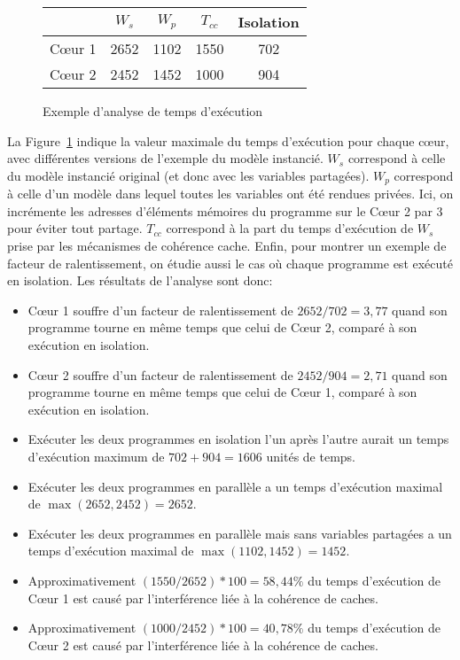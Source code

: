 \begin{example}
\begin{figure}[hbt]
\centering
\begin{tabular}{|c|c|c|c|c|}
\cline{2-5}
\multicolumn{1}{c|}{}
      & $W_s$ & $W_p$ & $T_{cc}$ & Isolation \\
\hline
Cœur 1 & 2652 & 1102 & 1550 & 702\\
\hline
Cœur 2 & 2452 & 1452 & 1000 & 904\\
\hline
\end{tabular}
\caption{Exemple d'analyse de temps d'exécution}
\label{fr:fig:analysis:wcet_calc}
\end{figure}
La Figure~\ref{fr:fig:analysis:wcet_calc} indique la valeur maximale du temps
d'exécution pour chaque cœur, avec différentes versions de l'exemple du modèle
instancié.
$W_s$ correspond à celle du modèle instancié original (et donc avec les
variables partagées). $W_p$ correspond à celle d'un modèle dans lequel toutes les
variables ont été rendues privées. Ici, on incrémente les adresses d'éléments
mémoires du programme sur le Cœur 2 par $3$ pour éviter tout partage. $T_{cc}$
correspond à la part du temps d'exécution de $W_s$ prise par les mécanismes de
cohérence cache. Enfin, pour montrer un exemple de facteur de ralentissement, on
étudie aussi le cas où chaque programme est exécuté en isolation.
Les résultats de l'analyse sont donc:
\begin{itemize}
    \setlength{\itemsep}{0pt}%
   \setlength{\parskip}{0pt}%
\item
   Cœur 1 souffre d'un facteur de ralentissement de $2652/702 = 3,77$ quand son
   programme tourne en même temps que celui de Cœur 2, comparé à son exécution
   en isolation.
\item
   Cœur 2 souffre d'un facteur de ralentissement de $2452/904 = 2,71$ quand son
   programme tourne en même temps que celui de Cœur 1, comparé à son exécution
   en isolation.
\item
   Exécuter les deux programmes en isolation l'un après l'autre aurait un temps
   d'exécution maximum de $702 + 904 = 1606$ unités de temps.
\item
   Exécuter les deux programmes en parallèle a un temps d'exécution maximal de
   $\max(2652, 2452) = 2652$.
\item
   Exécuter les deux programmes en parallèle mais sans variables partagées a un
   temps d'exécution maximal de $\max(1102, 1452) = 1452$.
\item
   Approximativement $(1550/2652)*100=58,44 \%$  du temps d'exécution de
   Cœur 1 est causé par l'interférence liée à la cohérence de caches.
\item
   Approximativement $(1000/2452)*100=40,78\%$ du temps d'exécution de
   Cœur 2 est causé par l'interférence liée à la cohérence de caches.
\end{itemize}
\end{example}


